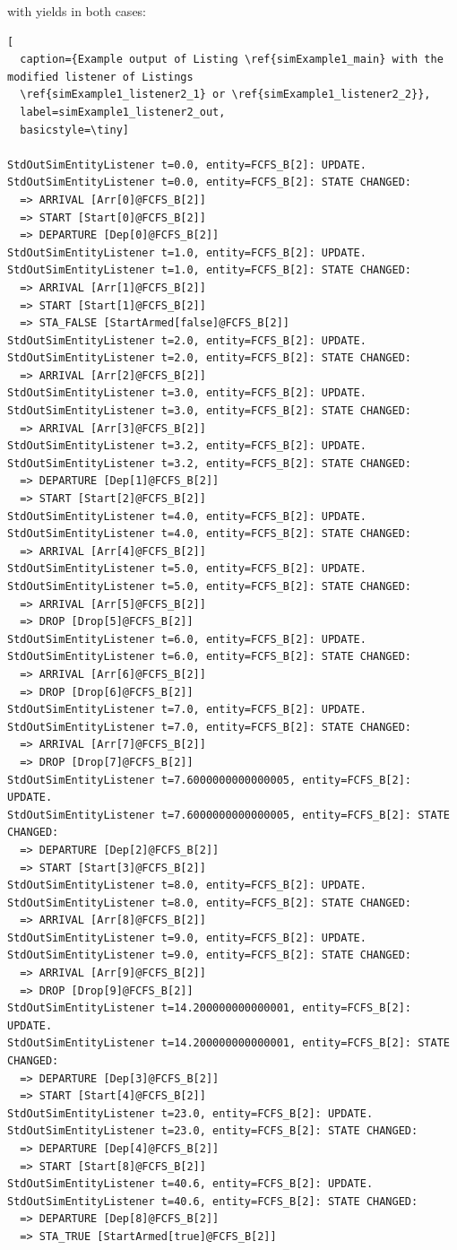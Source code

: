\documentclass[12pt]{book}
\begin{document}
with yields in both cases:

\begin{lstlisting}[
  caption={Example output of Listing \ref{simExample1_main} with the modified listener of Listings
  \ref{simExample1_listener2_1} or \ref{simExample1_listener2_2}},
  label=simExample1_listener2_out,
  basicstyle=\tiny]

StdOutSimEntityListener t=0.0, entity=FCFS_B[2]: UPDATE.
StdOutSimEntityListener t=0.0, entity=FCFS_B[2]: STATE CHANGED:
  => ARRIVAL [Arr[0]@FCFS_B[2]]
  => START [Start[0]@FCFS_B[2]]
  => DEPARTURE [Dep[0]@FCFS_B[2]]
StdOutSimEntityListener t=1.0, entity=FCFS_B[2]: UPDATE.
StdOutSimEntityListener t=1.0, entity=FCFS_B[2]: STATE CHANGED:
  => ARRIVAL [Arr[1]@FCFS_B[2]]
  => START [Start[1]@FCFS_B[2]]
  => STA_FALSE [StartArmed[false]@FCFS_B[2]]
StdOutSimEntityListener t=2.0, entity=FCFS_B[2]: UPDATE.
StdOutSimEntityListener t=2.0, entity=FCFS_B[2]: STATE CHANGED:
  => ARRIVAL [Arr[2]@FCFS_B[2]]
StdOutSimEntityListener t=3.0, entity=FCFS_B[2]: UPDATE.
StdOutSimEntityListener t=3.0, entity=FCFS_B[2]: STATE CHANGED:
  => ARRIVAL [Arr[3]@FCFS_B[2]]
StdOutSimEntityListener t=3.2, entity=FCFS_B[2]: UPDATE.
StdOutSimEntityListener t=3.2, entity=FCFS_B[2]: STATE CHANGED:
  => DEPARTURE [Dep[1]@FCFS_B[2]]
  => START [Start[2]@FCFS_B[2]]
StdOutSimEntityListener t=4.0, entity=FCFS_B[2]: UPDATE.
StdOutSimEntityListener t=4.0, entity=FCFS_B[2]: STATE CHANGED:
  => ARRIVAL [Arr[4]@FCFS_B[2]]
StdOutSimEntityListener t=5.0, entity=FCFS_B[2]: UPDATE.
StdOutSimEntityListener t=5.0, entity=FCFS_B[2]: STATE CHANGED:
  => ARRIVAL [Arr[5]@FCFS_B[2]]
  => DROP [Drop[5]@FCFS_B[2]]
StdOutSimEntityListener t=6.0, entity=FCFS_B[2]: UPDATE.
StdOutSimEntityListener t=6.0, entity=FCFS_B[2]: STATE CHANGED:
  => ARRIVAL [Arr[6]@FCFS_B[2]]
  => DROP [Drop[6]@FCFS_B[2]]
StdOutSimEntityListener t=7.0, entity=FCFS_B[2]: UPDATE.
StdOutSimEntityListener t=7.0, entity=FCFS_B[2]: STATE CHANGED:
  => ARRIVAL [Arr[7]@FCFS_B[2]]
  => DROP [Drop[7]@FCFS_B[2]]
StdOutSimEntityListener t=7.6000000000000005, entity=FCFS_B[2]: UPDATE.
StdOutSimEntityListener t=7.6000000000000005, entity=FCFS_B[2]: STATE CHANGED:
  => DEPARTURE [Dep[2]@FCFS_B[2]]
  => START [Start[3]@FCFS_B[2]]
StdOutSimEntityListener t=8.0, entity=FCFS_B[2]: UPDATE.
StdOutSimEntityListener t=8.0, entity=FCFS_B[2]: STATE CHANGED:
  => ARRIVAL [Arr[8]@FCFS_B[2]]
StdOutSimEntityListener t=9.0, entity=FCFS_B[2]: UPDATE.
StdOutSimEntityListener t=9.0, entity=FCFS_B[2]: STATE CHANGED:
  => ARRIVAL [Arr[9]@FCFS_B[2]]
  => DROP [Drop[9]@FCFS_B[2]]
StdOutSimEntityListener t=14.200000000000001, entity=FCFS_B[2]: UPDATE.
StdOutSimEntityListener t=14.200000000000001, entity=FCFS_B[2]: STATE CHANGED:
  => DEPARTURE [Dep[3]@FCFS_B[2]]
  => START [Start[4]@FCFS_B[2]]
StdOutSimEntityListener t=23.0, entity=FCFS_B[2]: UPDATE.
StdOutSimEntityListener t=23.0, entity=FCFS_B[2]: STATE CHANGED:
  => DEPARTURE [Dep[4]@FCFS_B[2]]
  => START [Start[8]@FCFS_B[2]]
StdOutSimEntityListener t=40.6, entity=FCFS_B[2]: UPDATE.
StdOutSimEntityListener t=40.6, entity=FCFS_B[2]: STATE CHANGED:
  => DEPARTURE [Dep[8]@FCFS_B[2]]
  => STA_TRUE [StartArmed[true]@FCFS_B[2]]

\end{lstlisting}
\end{document}
